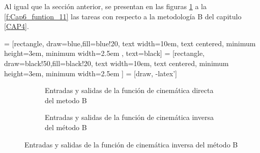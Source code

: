        Al igual que la sección anterior, se presentan en las figuras \ref{f:Cap6_funtion_7} a la \ref{f:Cap6_funtion_11} las tareas con respecto a la  metodología B del capitulo \ref{CAP4}. 
    
            \hspace{1cm}


     = [rectangle, draw=blue,fill=blue!20, text width=10em, text centered, minimum height=3em, minimum width=2.5em , text=black]
     = [rectangle, draw=black!50,fill=black!20, text width=10em, text centered, minimum height=3em, minimum width=2.5em ]
     = [draw, -latex']

    \begin{figure}[h]
        \centering
        \begin{subfigure}
                \centering
                    \caption{Entradas y salidas de la función de cinemática directa del metodo B}
                    \label{f:Cap6_funtion_7}
        \end{subfigure}
        
        \hspace{1cm}

        \begin{subfigure}
                \centering
                    \caption{Entradas y salidas de la función de cinemática inversa del método B}
                    \label{f:Cap6_funtion_8}
        \end{subfigure}
        

\end{figure}
